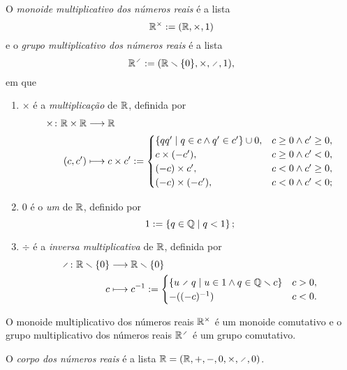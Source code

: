 \begin{definition}
O \emph{monoide multiplicativo dos números reais} é a lista
	\begin{equation*}
	\mathbb{R}^\times := (\mathbb{R},\times,1)
	\end{equation*}
e o \emph{grupo multiplicativo dos números reais} é a lista
	\begin{equation*}
	\R^{\div}:= (\R \setminus \{0\},\times,\div,1),
	\end{equation*}
em que
	\begin{enumerate}
	\item $\times$ é a \emph{multiplicação} de $\mathbb{R}$, definida por
		\begin{align*}
		\func{\times}{\R \times \R}{\R}{(c,c')}{
			c \times c' :=
			\begin{cases}
			\set{qq'}{q \in c \land q' \in c'} \cup 0,	& c \geq 0 \land c' \geq 0, \\
			c \times (-c'),			& c \geq 0 \land c' < 0, \\
			(-c) \times c',			& c < 0 \land c' \geq 0, \\
			(-c) \times (-c'),		& c < 0 \land c' < 0;
			\end{cases}
		}
		\end{align*}
	\item $0$ é o \emph{um} de $\mathbb{R}$, definido por
		\begin{equation*}
		1 := \left\{{q \in \mathbb{Q}}\;\middle\vert\;{q < 1}\right\};
		\end{equation*}
	\item $\div$ é a \emph{inversa multiplicativa} de $\mathbb{R}$, definida por
		\begin{align*}
		\func{\div}{\R \setminus \{0\}}{\R \setminus \{0\}}{c}{
			c\inv :=
			\begin{cases}
			\set{u \div q}{u \in 1 \land q \in \Q \setminus c}	& c > 0, \\
			-((-c)\inv)	& c < 0.
			\end{cases}
		}
		\end{align*}
	\end{enumerate}
\end{definition}

\begin{exercise}
O monoide multiplicativo dos números reais $\mathbb{R}^\times$ é um monoide comutativo e o grupo multiplicativo dos números reais $\R^{\div}$ é um grupo comutativo.
\end{exercise}

\begin{definition}
O \emph{corpo dos números reais} é a lista $\R = (\R,+,-,0,\times,\div,0)$.
\end{definition}

